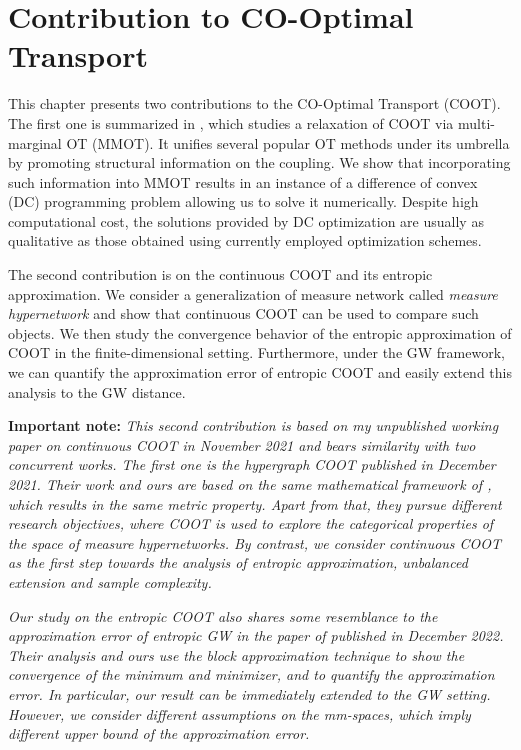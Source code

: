 
\chapter[Contribution to CO-Optimal Transport]{Contribution to CO-Optimal Transport}

\renewcommand{\contentsname}{Contents}
\localtableofcontents*
{}

\hfill \break
This chapter presents two contributions to the CO-Optimal Transport (COOT).
The first one is summarized in \citep{Tran21},
which studies a relaxation of COOT via multi-marginal OT (MMOT).
It unifies several popular OT methods under its umbrella by promoting structural information
on the coupling. We show that incorporating such information into MMOT results in an
instance of a difference of convex (DC) programming problem allowing us to solve it numerically.
Despite high computational cost, the solutions provided by DC optimization are usually
as qualitative as those obtained using currently employed optimization schemes.

The second contribution is on the continuous COOT and its entropic approximation.
We consider a generalization of measure network called \textit{measure hypernetwork}
and show that continuous COOT can be used to compare such objects.
We then study the convergence behavior of the entropic approximation of COOT in the finite-dimensional
setting. Furthermore, under the GW framework, we can quantify the approximation error of
entropic COOT and easily extend this analysis to the GW distance.

\textbf{Important note:} \textit{This second contribution is based on my unpublished working paper
on continuous COOT in November 2021 and bears similarity with two concurrent works.
The first one is the hypergraph COOT \citep{Chowdhury21b} published in December 2021.
Their work and ours are based on the same mathematical framework of \citep{Chowdhury19},
which results in the same metric property. Apart from that, they pursue different research objectives,
where COOT is used to explore the categorical properties of the space of measure hypernetworks.
By contrast, we consider continuous COOT as the first step towards the analysis of
entropic approximation, unbalanced extension and sample complexity.}

\textit{Our study on the entropic COOT also shares some resemblance to the approximation error of
entropic GW in the paper of \citep{Zhang23} published in December 2022.
Their analysis and ours use the block approximation technique \citep{Carlier17}
to show the convergence of the minimum and minimizer, and to quantify the approximation error.
In particular, our result can be immediately extended to the GW setting. However,
we consider different assumptions on the mm-spaces,
which imply different upper bound of the approximation error.}

